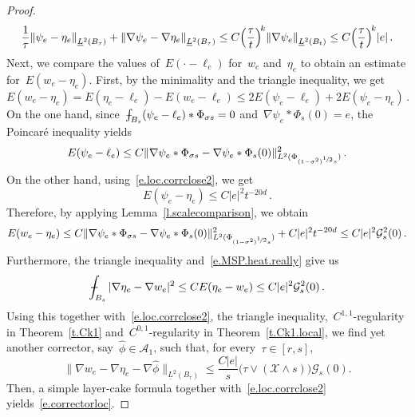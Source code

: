 \documentclass[11pt,twoside]{article} %
\numberwithin{equation}{section}
\theoremstyle{definition}
\let\originalleft\left
\let\originalright\right
\renewcommand{\left}{\mathopen{}\mathclose\bgroup\originalleft}
\renewcommand{\right}{\aftergroup\egroup\originalright}
\renewcommand*{\hat}{\widehat}
\newcommand{\X}{\mathcal{X}}
\def\Xint#1{\mathchoice
{\XXint\displaystyle\textstyle{#1}}%
{\XXint\textstyle\scriptstyle{#1}}%
{\XXint\scriptstyle\scriptscriptstyle{#1}}%
{\XXint\scriptscriptstyle\scriptscriptstyle{#1}}%
\!\int}
\def\XXint#1#2#3{{\setbox0=\hbox{$#1{#2#3}{\int}$}
\vcenter{\hbox{$#2#3$}}\kern-.5\wd0}}
\def\fint{\Xint-}
\newcommand{\A}{\mathcal{A}}
\begin{document}
\begin{proof}
\begin{align}
\frac1\tau \left\|  \psi_e -  \eta_e \right\|_{\underline{L}^2 \left( B_{\tau} \right)} 
+
\left\|  \nabla  \psi_e -  \nabla  \eta_e \right\|_{\underline{L}^2 \left( B_{\tau} \right)} 
\leq 
C  \left( \frac{\tau}{t}\right)^{\!k}  \left\| \nabla \psi_e \right\|_{\underline{L}^2 \left( B_{t} \right)}  
\leq 
C\left( \frac{\tau}{t}\right)^{\!k} |e|
\,.
\end{align}
Next, we compare the values of~$E(\cdot - \ell_e)$ for~$w_e$ and~$\eta_e$ to obtain an estimate for~$E(w_e-\eta_e)$.  First, by the minimality and the triangle inequality, we get
\begin{equation*}  
E(w_e-\eta_e) 
= 
E(\eta_e-\ell_e) - E(w_e-\ell_e) 
\leq 
2 E(\psi_e-\ell_e) +  2 E(\psi_e-\eta_e) 
\,.
\end{equation*}
On the one hand, since~$\fint_{B_s} (\psi_e - \ell_e) \ast \Phi_{\sigma s} = 0$ and~$\nabla \psi_e \ast  \Phi_s (0)  = e$, the Poincar\'e inequality yields
\begin{equation*}  
 E (\psi_e - \ell_e) 
 \leq 
 C \| \nabla \psi_e \ast \Phi_{\sigma s} - \nabla \psi_e \ast \Phi_{s}(0) \|_{L^2(\Phi_{(1-\sigma^2)^{\nicefrac 12} s })}^2 
 \,.
\end{equation*}
On the other hand, using~\eqref{e.loc.corrclose2}, we get
\begin{equation*}  
E(\psi_e-\eta_e)  \leq C |e|^2 t^{-20d} \,.
\end{equation*}
Therefore, by applying Lemma~\ref{l.scalecomparison}, we obtain 
\begin{equation*}  
E(w_e-\eta_e) 
\leq 
C\| \nabla \psi_e \ast \Phi_{\sigma s} - \nabla \psi_e \ast \Phi_{s}(0) \|_{L^2(\Phi_{(1-\sigma^2)^{\nicefrac 12} s })}^2 
 + C|e|^2 t^{-20d}  
 \leq 
 C|e|^2  \mathcal{G}_{s}^2(0)
\,.
\end{equation*}
Furthermore, the triangle inequality and~\eqref{e.MSP.heat.really} give us
\begin{equation*}  
\fint_{B_{s} } |\nabla \eta_e - \nabla w_e|^2 
\leq 
C E(\eta_e - w_e) 
\leq 
C |e|^2 \mathcal{G}_{s}^2(0)
\,.
\end{equation*}
Using this together with~\eqref{e.loc.corrclose2}, the triangle inequality,~$C^{1,1}$-regularity in Theorem~\ref{t.Ck1} and~$C^{0,1}$-regularity in Theorem~\ref{t.Ck1.local}, we find yet another corrector, say~$\hat\phi \in \A_1$, such that, for every~$\tau \in [r,s]$, 
\begin{equation*}  
\| \nabla w_e - \nabla \eta_e - \nabla \hat\phi \|_{\underline{L}^2(B_\tau)}  \leq \frac{C |e|}{s} \bigl( \tau \vee (\X \wedge s) \bigr) \mathcal{G}_{s}(0) .
\end{equation*}
Then, a simple layer-cake formula together with~\eqref{e.loc.corrclose2} yields~\eqref{e.correctorloc}. 


\end{proof}
\end{document}
